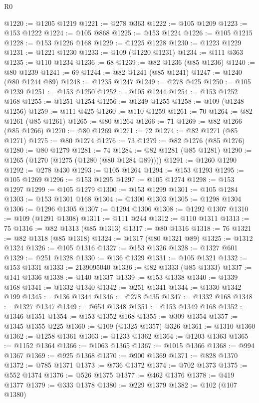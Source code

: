 \begin{lexlean}{R0}
\begin{coremodule}
@1220 := @1205 @1219
@1221 := @278 @363
@1222 := @105 @1209
@1223 := @153 @1222
@1224 := @105 @868
@1225 := @153 @1224
@1226 := @105 @1215
@1228 := @153 @1226 @168
@1229 := @1225 @1228
@1230 := @1223 @1229
@1231 := @1221 @1230
@1233 := @109 (@1220 @1231)
@1234 := @111 @363
@1235 := @110 @1234
@1236 := 68
@1239 := @82 @1236 (@85 @1236)
@1240 := @80 @1239
@1241 := 69
@1244 := @82 @1241 (@85 @1241)
@1247 := @1240 (@80 @1244 @89)
@1248 := @1235 @1247
@1249 := @278 @425
@1250 := @105 @1239
@1251 := @153 @1250
@1252 := @105 @1244
@1254 := @153 @1252 @168
@1255 := @1251 @1254
@1256 := @1249 @1255
@1258 := @109 (@1248 @1256)
@1259 := @111 @425
@1260 := @110 @1259
@1261 := 70
@1264 := @82 @1261 (@85 @1261)
@1265 := @80 @1264
@1266 := 71
@1269 := @82 @1266 (@85 @1266)
@1270 := @80 @1269
@1271 := 72
@1274 := @82 @1271 (@85 @1271)
@1275 := @80 @1274
@1276 := 73
@1279 := @82 @1276 (@85 @1276)
@1280 := @80 @1279
@1281 := 74
@1284 := @82 @1281 (@85 @1281)
@1290 := @1265 (@1270 (@1275 (@1280 (@80 @1284 @89))))
@1291 := @1260 @1290
@1292 := @278 @430
@1293 := @105 @1264
@1294 := @153 @1293
@1295 := @105 @1269
@1296 := @153 @1295
@1297 := @105 @1274
@1298 := @153 @1297
@1299 := @105 @1279
@1300 := @153 @1299
@1301 := @105 @1284
@1303 := @153 @1301 @168
@1304 := @1300 @1303
@1305 := @1298 @1304
@1306 := @1296 @1305
@1307 := @1294 @1306
@1308 := @1292 @1307
@1310 := @109 (@1291 @1308)
@1311 := @111 @244
@1312 := @110 @1311
@1313 := 75
@1316 := @82 @1313 (@85 @1313)
@1317 := @80 @1316
@1318 := 76
@1321 := @82 @1318 (@85 @1318)
@1324 := @1317 (@80 @1321 @89)
@1325 := @1312 @1324
@1326 := @105 @1316
@1327 := @153 @1326
@1328 := @1327 @601
@1329 := @251 @1328
@1330 := @136 @1329
@1331 := @105 @1321
@1332 := @153 @1331
@1333 := 2139095040
@1336 := @82 @1333 (@85 @1333)
@1337 := @141 @1336
@1338 := @140 @1337
@1339 := @153 @1338
@1340 := @1339 @168
@1341 := @1332 @1340
@1342 := @251 @1341
@1344 := @1330 @1342 @199
@1345 := @136 @1344
@1346 := @278 @435
@1347 := @1332 @168
@1348 := @1327 @1347
@1349 := @654 @1348
@1351 := @153 @1349 @168
@1352 := @1346 @1351
@1354 := @153 @1352 @168
@1355 := @309 @1354
@1357 := @1345 @1355 @225
@1360 := @109 (@1325 @1357) @326
@1361 := @1310 @1360
@1362 := @1258 @1361
@1363 := @1233 @1362
@1364 := @1203 @1363
@1365 := @1152 @1364
@1366 := @1063 @1365
@1367 := @1015 @1366
@1368 := @994 @1367
@1369 := @925 @1368
@1370 := @900 @1369
@1371 := @828 @1370
@1372 := @785 @1371
@1373 := @736 @1372
@1374 := @702 @1373
@1375 := @552 @1374
@1376 := @526 @1375
@1377 := @462 @1376
@1378 := @419 @1377
@1379 := @333 @1378
@1380 := @229 @1379
@1382 := @102 (@107 @1380)

\end{coremodule}
\end{lexlean}
